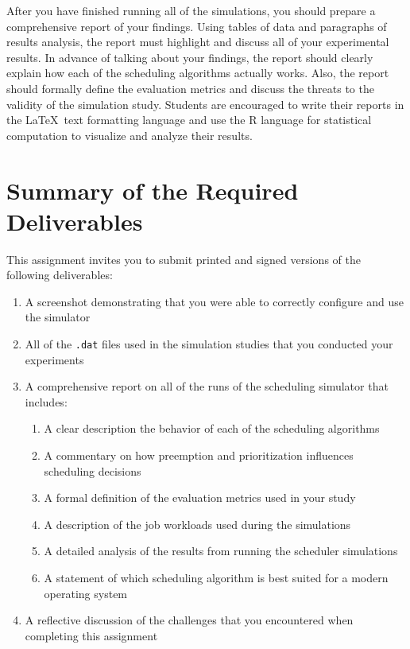   After you have finished running all of the simulations, you should prepare a comprehensive report of your findings.
  Using tables of data and paragraphs of results analysis, the report must highlight and discuss all of your
  experimental results. In advance of talking about your findings, the report should clearly explain how each of the
  scheduling algorithms actually works. Also, the report should formally define the evaluation metrics and discuss the
  threats to the validity of the simulation study. Students are encouraged to write their reports in the
  \LaTeX~text formatting language and use the R language for statistical computation to visualize and analyze their results.

\section*{Summary of the Required Deliverables}

This assignment invites you to submit printed and signed versions of the following deliverables: 

\begin{enumerate}

  \itemsep0in

  \item A screenshot demonstrating that you were able to correctly configure and use the simulator

  \item All of the {\tt .dat} files used in the simulation studies that you conducted your experiments

  \item A comprehensive report on all of the runs of the scheduling simulator that includes:

  \begin{enumerate}

  \itemsep0in
    \item A clear description the behavior of each of the scheduling algorithms
    \item A commentary on how preemption and prioritization influences scheduling decisions
    \item A formal definition of the evaluation metrics used in your study
    \item A description of the job workloads used during the simulations
    \item A detailed analysis of the results from running the scheduler simulations
    \item A statement of which scheduling algorithm is best suited for a modern operating system

  \end{enumerate}

  \item A reflective discussion of the challenges that you encountered when completing this assignment

\end{enumerate}

